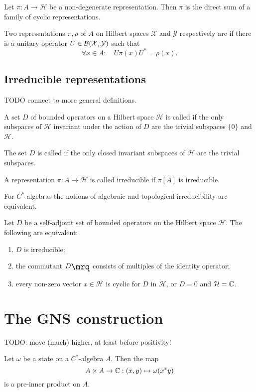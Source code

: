 \begin{proposition}
Let $\pi:A\to \mathcal{H}$ be a non-degenerate representation. Then $\pi$ is the direct sum of a family of cyclic representations.
\end{proposition}

\begin{definition}
Two representations $\pi,\rho$ of $A$ on Hilbert spaces $\mathcal{X}$ and $\mathcal{Y}$ respectively are  if there is a unitary operator $U\in\operatorname{\mathcal{B}}(\mathcal{X}, \mathcal{Y})$ such that
\[ \forall x\in A: \quad U\pi(x)U^* = \rho(x). \]
\end{definition}

\subsection{Irreducible representations}
TODO connect to more general definitions.
\begin{definition}
A set $D$ of bounded operators on a Hilbert space $\mathcal{H}$ is called  if the only subspaces of $\mathcal{H}$ invariant under the action of $D$ are the trivial subspaces $\{0\}$ and $\mathcal{H}$.

The set $D$ is called  if the only closed invariant subspaces of $\mathcal{H}$ are the trivial subspaces.

A representation $\pi: A\to\mathcal{H}$ is called irreducible if $\pi[A]$ is irreducible.
\end{definition}
\begin{proposition}
For $C^*$-algebras the notions of algebraic and topological irreducibility are equivalent.
\end{proposition}

\begin{proposition}
Let $D$ be a self-adjoint set of bounded operators on the Hilbert space $\mathcal{H}$. The following are equivalent:
\begin{enumerate}
\item $D$ is irreducible;
\item the commutant $\comm{D}$ consists of multiples of the identity operator;
\item every non-zero vector $x\in\mathcal{H}$ is cyclic for $D$ in $\mathcal{H}$, or $D =0$ and $\mathcal{H} = \mathbb{C}$.
\end{enumerate}
\end{proposition}

\section{The GNS construction}
TODO: move (much) higher, at least before positivity!
\begin{lemma}
Let $\omega$ be a state on a $C^*$-algebra $A$. Then the map
\[ A\times A \to \mathbb{C}: (x,y)\mapsto \omega(x^*y) \]
is a pre-inner product on $A$.
\end{lemma}

